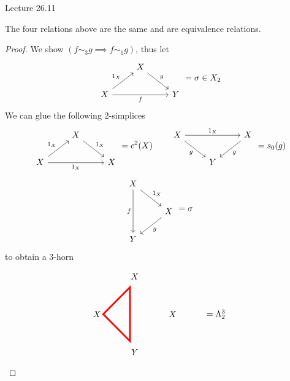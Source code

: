 Lecture 26.11

\begin{prop}
    The four relations above are the same and are equivalence relations.
\end{prop}

\begin{proof}
    We show $(f \sim_3 g \implies f \sim_1 g)$, thus let 
    \[
    \begin{tikzcd}
        &
        X
        \arrow[rd,"g"]
        &\\
        X
        \arrow[ru, "1_X"]
        \arrow[rr,"f"']
        &
        &
        Y
    \end{tikzcd} 
    = \sigma \in X_2
    \]
    We can glue the following $2$-simplices 
    \[
    \begin{tikzcd}
        &
        X
        \arrow[rd,"1_X"]
        &\\
        X
        \arrow[ru, "1_X"]
        \arrow[rr,"1_X"']
        &
        &
        X
    \end{tikzcd} 
    =c^2(X)
    \qquad
    \begin{tikzcd}
        X
        \arrow[rr,"1_X"]
        \arrow[rd,"g"']
        &
        &
        X
        \arrow[ld, "g"]
        \\
        &
        Y
        &
    \end{tikzcd}
    =s_0(g)
    \]
    \[
    \begin{tikzcd}
        X
        \arrow[dd,"f"']
        \arrow[rd,"1_X"]
        &
        \\
        &
        X
        \arrow[ld,"g"]
        \\
        Y
    \end{tikzcd}
    =\sigma
    \]
    to obtain a $3$-horn
    \[
    \begin{tikzpicture}[>=stealth,->,shorten >=2pt,looseness=.5,auto]
            \matrix[anchor=center, column sep=1cm, row sep=1cm] at (0,0)
            {
                                & \node(X_1) {$X$};   &                 &\\
             \node(X_0) {$X$};     &                  & \node(X_2) {$X$};& \node(X_24) {$=\Lambda_2^3$};  \\
                                & \node(X_3) {$Y$};   &                 &\\
            };
            \draw[line width=2pt,color=red] (-1.2,1.1) -- (-1.2,-1.1) -- (-2.3, 0) -- cycle;
            \begin{scope}[every node/.style={font=\small\itshape}]

\end{scope}
\end{tikzpicture}\]
\end{proof}
